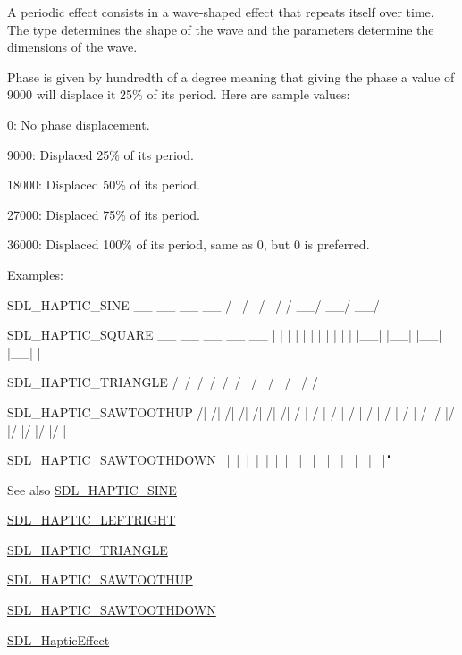 A periodic effect consists in a wave-\/shaped effect that repeats itself over time. The type determines the shape of the wave and the parameters determine the dimensions of the wave.

Phase is given by hundredth of a degree meaning that giving the phase a value of 9000 will displace it 25\% of its period. Here are sample values\+:
\begin{DoxyItemize}
\item 0\+: No phase displacement.
\item 9000\+: Displaced 25\% of its period.
\item 18000\+: Displaced 50\% of its period.
\item 27000\+: Displaced 75\% of its period.
\item 36000\+: Displaced 100\% of its period, same as 0, but 0 is preferred.
\end{DoxyItemize}

Examples\+: \begin{DoxyVerb}SDL_HAPTIC_SINE
  __      __      __      __
 /  \    /  \    /  \    /
/    \__/    \__/    \__/

SDL_HAPTIC_SQUARE
 __    __    __    __    __
|  |  |  |  |  |  |  |  |  |
|  |__|  |__|  |__|  |__|  |

SDL_HAPTIC_TRIANGLE
  /\    /\    /\    /\    /\
 /  \  /  \  /  \  /  \  /
/    \/    \/    \/    \/

SDL_HAPTIC_SAWTOOTHUP
  /|  /|  /|  /|  /|  /|  /|
 / | / | / | / | / | / | / |
/  |/  |/  |/  |/  |/  |/  |

SDL_HAPTIC_SAWTOOTHDOWN
\  |\  |\  |\  |\  |\  |\  |
 \ | \ | \ | \ | \ | \ | \ |
  \|  \|  \|  \|  \|  \|  \|
\end{DoxyVerb}


\begin{DoxySeeAlso}{See also}
\mbox{\hyperlink{_s_d_l__haptic_8h_aa6d75adbfcdda5075078e7a2849da5c0}{S\+D\+L\+\_\+\+H\+A\+P\+T\+I\+C\+\_\+\+S\+I\+NE}} 

\mbox{\hyperlink{_s_d_l__haptic_8h_ae047624d8458ff6400887c37a36f86d3}{S\+D\+L\+\_\+\+H\+A\+P\+T\+I\+C\+\_\+\+L\+E\+F\+T\+R\+I\+G\+HT}} 

\mbox{\hyperlink{_s_d_l__haptic_8h_ae8123eaa51511507375ba6ef9220fa46}{S\+D\+L\+\_\+\+H\+A\+P\+T\+I\+C\+\_\+\+T\+R\+I\+A\+N\+G\+LE}} 

\mbox{\hyperlink{_s_d_l__haptic_8h_ab8e3f40f3c2bcee8905d13b634363c3f}{S\+D\+L\+\_\+\+H\+A\+P\+T\+I\+C\+\_\+\+S\+A\+W\+T\+O\+O\+T\+H\+UP}} 

\mbox{\hyperlink{_s_d_l__haptic_8h_afd64aa747034a7ccf4b55f6246525701}{S\+D\+L\+\_\+\+H\+A\+P\+T\+I\+C\+\_\+\+S\+A\+W\+T\+O\+O\+T\+H\+D\+O\+WN}} 

\mbox{\hyperlink{union_s_d_l___haptic_effect}{S\+D\+L\+\_\+\+Haptic\+Effect}} 
\end{DoxySeeAlso}


